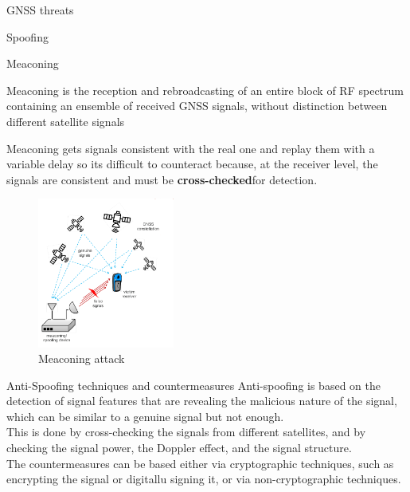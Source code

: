 \begin{section}{GNSS threats}
\begin{subsection}{Spoofing}
      \begin{subsubsection}{Meaconing}
        \begin{boxH}
          Meaconing is the reception and rebroadcasting of an entire block of RF spectrum 
          containing an ensemble of received GNSS signals, without distinction between different 
          satellite signals
        \end{boxH}
        Meaconing gets signals consistent with the real one and replay them with a variable delay
        so its difficult to counteract because, at the receiver level, the signals are consistent
        and must be \textbf{cross-checked}for detection.
        \begin{figure}[h]
          \centering
          \includegraphics[width=0.4\textwidth]{img/wireless/meaconing.png}
          \caption{Meaconing attack}
          \label{fig:GNSS meaconing}
        \end{figure}

      \end{subsubsection}

      \begin{subsubsection}{Anti-Spoofing techniques and countermeasures}
        Anti-spoofing is based on the detection of signal features that are revealing the 
        malicious nature of the signal, which can be similar to a genuine signal but not enough.\\
        This is done by cross-checking the signals from different satellites, and by checking the
        signal power, the Doppler effect, and the signal structure.\\

        The countermeasures can be based either via cryptographic techniques, such as encrypting the
        signal or digitallu signing it, or via non-cryptographic techniques.
      \end{subsubsection}

    \end{subsection}
  \end{section}
